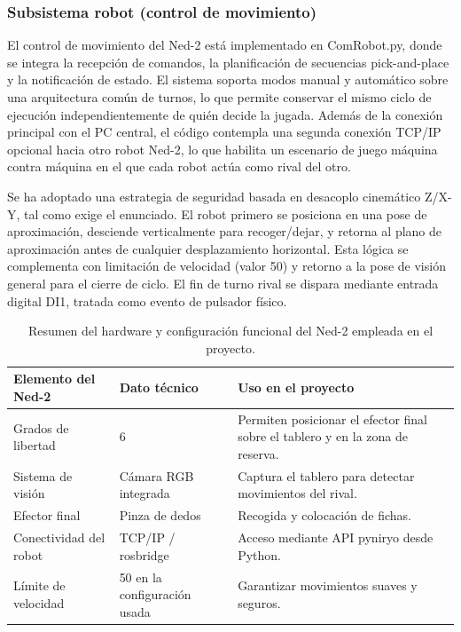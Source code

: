 \documentclass[12pt,a4paper]{article}
\begin{document}
\subsubsection{Subsistema robot (control de movimiento)}
El control de movimiento del Ned-2 está implementado en ComRobot.py, donde se integra la recepción de comandos, la planificación de secuencias pick-and-place y la notificación de estado. El sistema soporta modos manual y automático sobre una arquitectura común de turnos, lo que permite conservar el mismo ciclo de ejecución independientemente de quién decide la jugada. Además de la conexión principal con el PC central, el código contempla una segunda conexión TCP/IP opcional hacia otro robot Ned-2, lo que habilita un escenario de juego máquina contra máquina en el que cada robot actúa como rival del otro.
\par
Se ha adoptado una estrategia de seguridad basada en desacoplo cinemático Z/X-Y, tal como exige el enunciado. El robot primero se posiciona en una pose de aproximación, desciende verticalmente para recoger/dejar, y retorna al plano de aproximación antes de cualquier desplazamiento horizontal. Esta lógica se complementa con limitación de velocidad (valor 50) y retorno a la pose de visión general para el cierre de ciclo. El fin de turno rival se dispara mediante entrada digital DI1, tratada como evento de pulsador físico.

\begin{table}[H]
\centering
\footnotesize
\begin{tabular}{P{0.28\textwidth} P{0.18\textwidth} P{0.42\textwidth}}
\toprule
\textbf{Elemento del Ned-2} & \textbf{Dato técnico} & \textbf{Uso en el proyecto} \\
\midrule
Grados de libertad & 6 & Permiten posicionar el efector final sobre el tablero y en la zona de reserva. \\
Sistema de visión & Cámara RGB integrada & Captura el tablero para detectar movimientos del rival. \\
Efector final & Pinza de dedos & Recogida y colocación de fichas. \\
Conectividad del robot & TCP/IP / rosbridge & Acceso mediante API pyniryo desde Python. \\
Límite de velocidad & 50 en la configuración usada & Garantizar movimientos suaves y seguros. \\
\bottomrule
\end{tabular}
\caption{Resumen del hardware y configuración funcional del Ned-2 empleada en el proyecto.}
\end{table}
\end{document}
